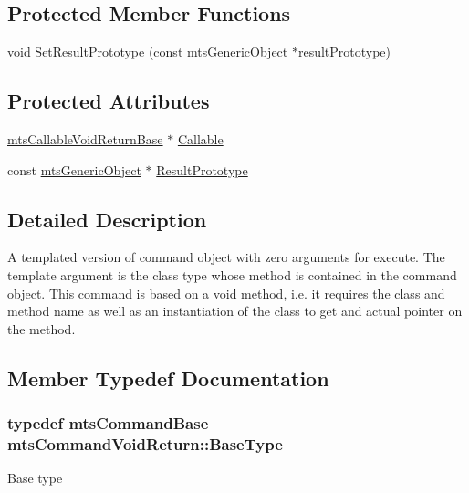 \subsection*{Protected Member Functions}
\begin{DoxyCompactItemize}
\item 
void \hyperlink{classmts_command_void_return_a1393eee6b6e79629738af15bc486b68f}{Set\+Result\+Prototype} (const \hyperlink{classmts_generic_object}{mts\+Generic\+Object} $\ast$result\+Prototype)
\end{DoxyCompactItemize}
\subsection*{Protected Attributes}
\begin{DoxyCompactItemize}
\item 
\hyperlink{classmts_callable_void_return_base}{mts\+Callable\+Void\+Return\+Base} $\ast$ \hyperlink{classmts_command_void_return_a724dc0b6b5cc0a0fcc783aaa39e0ec8e}{Callable}
\item 
const \hyperlink{classmts_generic_object}{mts\+Generic\+Object} $\ast$ \hyperlink{classmts_command_void_return_aaf7b0c693d09cd4664f114b97200911d}{Result\+Prototype}
\end{DoxyCompactItemize}


\subsection{Detailed Description}
A templated version of command object with zero arguments for execute. The template argument is the class type whose method is contained in the command object. This command is based on a void method, i.\+e. it requires the class and method name as well as an instantiation of the class to get and actual pointer on the method. 

\subsection{Member Typedef Documentation}
\hypertarget{classmts_command_void_return_a41ef4fa87ecb46aec2235730bdcc1088}{}
\subsubsection[{Base\+Type}]{\setlength{\rightskip}{0pt plus 5cm}typedef {\bf mts\+Command\+Base} {\bf mts\+Command\+Void\+Return\+::\+Base\+Type}}\label{classmts_command_void_return_a41ef4fa87ecb46aec2235730bdcc1088}
Base type \hypertarget{classmts_command_void_return_a101cc8bc0761aa0ab210c4f6d59ad81c}{}
